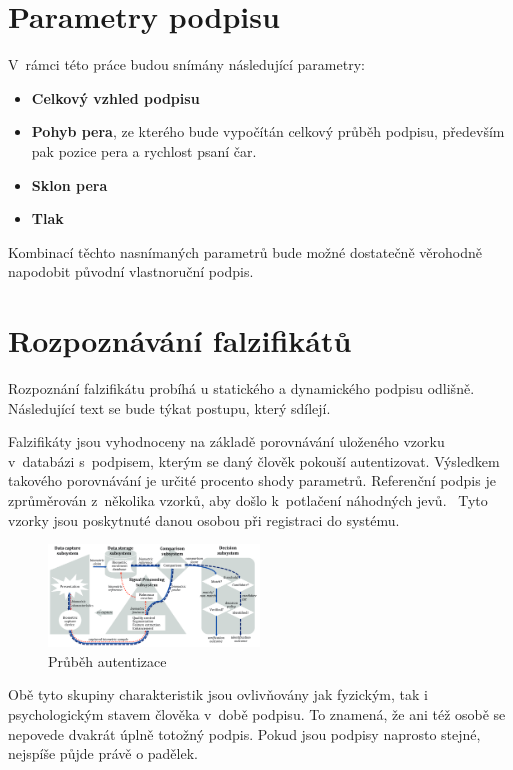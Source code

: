 \newpage

\section{Parametry podpisu}
V~rámci této práce budou snímány následující parametry:
\begin{itemize}
  \item \textbf{Celkový vzhled podpisu}
  \item \textbf{Pohyb pera}, ze kterého bude vypočítán celkový průběh podpisu, především pak pozice pera a rychlost psaní čar. 
  \item \textbf{Sklon pera} 
  \item \textbf{Tlak}
\end{itemize}
Kombinací těchto nasnímaných parametrů bude možné dostatečně věrohodně napodobit původní vlastnoruční podpis. 

\section{Rozpoznávání falzifikátů}
Rozpoznání falzifikátu probíhá u statického a dynamického podpisu odlišně. 
Následující text se bude týkat postupu, který sdílejí.

Falzifikáty jsou vyhodnoceny na základě porovnávání uloženého vzorku v~databázi s~podpisem, kterým se daný člověk pokouší autentizovat.
Výsledkem takového porovnávání je určité procento shody parametrů.
Referenční podpis je zprůměrován z~několika vzorků, aby došlo k~potlačení náhodných jevů.~\cite{VUT2009} %
Tyto vzorky jsou poskytnuté danou osobou při registraci do systému.

\begin{figure}[h]
  \centering
  \includegraphics[width=0.5\textwidth]{obrazky-figures/proces_autentizace.png}
  \caption{Průběh autentizace~\cite{ISOIEC19795-1_2021}}
  \label{fig:proces_autentizace} %
\end{figure}

Obě tyto skupiny charakteristik jsou ovlivňovány jak fyzickým, tak i psychologickým stavem člověka v~době podpisu.
To znamená, že ani též osobě se nepovede dvakrát úplně totožný podpis.
Pokud jsou podpisy naprosto stejné, nejspíše půjde právě o padělek.

